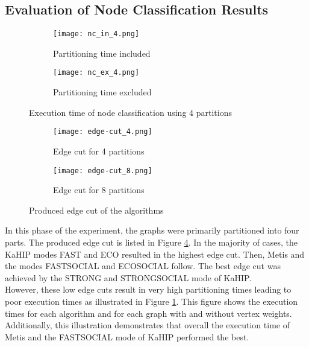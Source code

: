 \documentclass[acmsmall,nonacm,screen,review]{acmart}
\begin{document}
\subsection{Evaluation of Node Classification Results}
\begin{figure}[bt!]
     \centering
     \begin{subfigure}[b]{0.45\textwidth}
         \centering
         \texttt{[image: nc\_in\_4.png]}
         \caption{Partitioning time included}
         \label{nc_in_4}
     \end{subfigure}
     \hfill
     \begin{subfigure}[b]{0.45\textwidth}
         \centering
         \texttt{[image: nc\_ex\_4.png]}
         \caption{Partitioning time excluded}
         \label{nc_ex_4}
     \end{subfigure}
     \caption{Execution time of node classification using 4 partitions}
     \label{nc_results}
\end{figure}
\begin{figure}[bt!]
     \centering
     \begin{subfigure}[b]{0.45\textwidth}
         \centering
         \texttt{[image: edge-cut\_4.png]}
         \caption{Edge cut for 4 partitions}
         \label{cut_4}
     \end{subfigure}
     \hfill
     \begin{subfigure}[b]{0.45\textwidth}
         \centering
         \texttt{[image: edge-cut\_8.png]}
         \caption{Edge cut for 8 partitions}
         \label{cut_8}
     \end{subfigure}
     \caption{Produced edge cut of the algorithms}
     \label{cut}
\end{figure}
In this phase of the experiment, the graphs were primarily partitioned into four parts. The produced edge cut is listed in Figure \ref{cut_4}. In the majority of cases, the KaHIP modes FAST and ECO resulted in the highest edge cut. Then, Metis and the modes FASTSOCIAL and ECOSOCIAL follow. The best edge cut was achieved by the STRONG and STRONGSOCIAL mode of KaHIP. \\ 
However, these low edge cuts result in very high partitioning times leading to poor execution times as illustrated in Figure \ref{nc_in_4}. This figure shows the execution times for each algorithm and for each graph with and without vertex weights. Additionally, this illustration demonstrates that overall the execution time of Metis and the FASTSOCIAL mode of KaHIP performed the best.  \\
\end{document}
